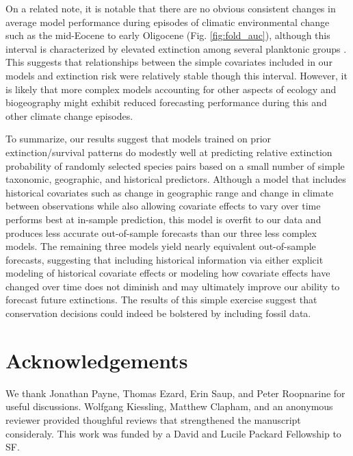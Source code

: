 \documentclass[12pt,letterpaper]{article}
\begin{document}
\begin{refsection}
On a related note, it is notable that there are no obvious consistent changes in average model performance during episodes of climatic environmental change such as the mid-Eocene to early Oligocene (Fig. \ref{fig:fold_auc}), although this interval is characterized by elevated extinction among several planktonic groups \citep{Prothero1994,Wade2008,Kamikuri2012}. This suggests that relationships between the simple covariates included in our models and extinction risk were relatively stable though this interval.  However, it is likely that more complex models accounting for other aspects of ecology and biogeography might exhibit reduced forecasting performance during this and other climate change episodes.

To summarize, our results suggest that models trained on prior extinction/survival patterns do modestly well at predicting relative extinction probability of randomly selected species pairs based on a small number of simple taxonomic, geographic, and historical predictors. Although a model that includes historical covariates such as change in geographic range and change in climate between observations while also allowing covariate effects to vary over time performs best at in-sample prediction, this model is overfit to our data and produces less accurate out-of-sample forecasts than our three less complex models. The remaining three models yield nearly equivalent out-of-sample forecasts, suggesting that including historical information via either explicit modeling of historical covariate effects or modeling how covariate effects have changed over time does not diminish and may ultimately improve our ability to forecast future extinctions. The results of this simple exercise suggest that conservation decisions could indeed be bolstered by including fossil data.


\section{Acknowledgements}

We thank Jonathan Payne, Thomas Ezard, Erin Saup, and Peter Roopnarine for useful discussions. Wolfgang Kiessling, Matthew Clapham, and an anonymous reviewer provided thoughful reviews that strengthened the manuscript consideraly. This work was funded by a David and Lucile Packard Fellowship to SF.


\printbibliography
\end{refsection}
\end{document}
